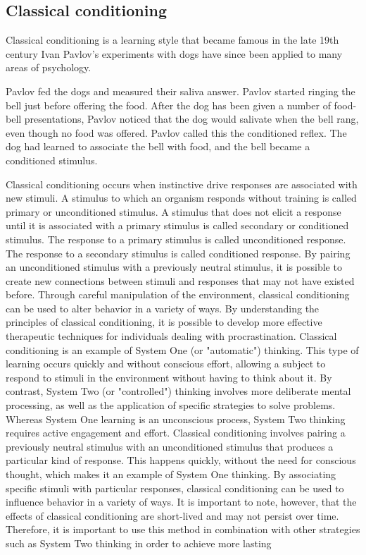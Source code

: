 \subsection{Classical conditioning}

Classical conditioning is a learning style that became famous in the late 19th century
Ivan Pavlov's experiments with dogs have since been applied to many areas of
psychology.

Pavlov fed the dogs and measured their saliva
answer. Pavlov started ringing the bell just before offering the food.
After the dog has been given a  number of food-bell presentations,
Pavlov noticed that the dog would salivate when the bell rang, even
though no food was offered. Pavlov called this the conditioned reflex.
The dog had learned to associate the bell with food, and the bell
became a conditioned stimulus.

Classical conditioning occurs when instinctive drive responses are associated
with new stimuli.
A stimulus to which an organism responds without training is called
primary or unconditioned stimulus. A stimulus that does not elicit a
response until it is associated with a primary stimulus is called
secondary or conditioned stimulus. The response to a primary stimulus
is called unconditioned response. The response to a secondary stimulus
is called conditioned response.
By pairing an unconditioned stimulus with a previously neutral stimulus, it is possible to create new connections
between stimuli and responses that may not have existed before. Through careful manipulation of the environment,
classical conditioning can be used to alter behavior in a variety of ways.
By understanding the principles of classical conditioning, it is possible to develop more effective therapeutic techniques for individuals dealing with procrastination.\cite{Rehman2022Aug}
Classical conditioning is an example of System One (or "automatic") thinking.
This type of learning occurs quickly and without conscious effort,
allowing a subject to respond to stimuli in the environment without having to think about it.
By contrast, System Two (or "controlled") thinking involves more deliberate mental processing, as well as the application of specific strategies to solve problems. Whereas System One learning is an unconscious process, System Two thinking requires active engagement and effort. Classical conditioning involves pairing a previously neutral stimulus with an unconditioned stimulus that produces a particular kind of response. This happens quickly, without the need for conscious thought, which makes it an example of System One thinking. By associating specific stimuli with particular responses, classical conditioning can be used to influence behavior in a variety of ways.  It is important to note, however, that the effects of classical conditioning are short-lived and may not persist over time. Therefore, it is important to use this method in combination with other strategies such as System Two thinking in order to achieve more lasting

